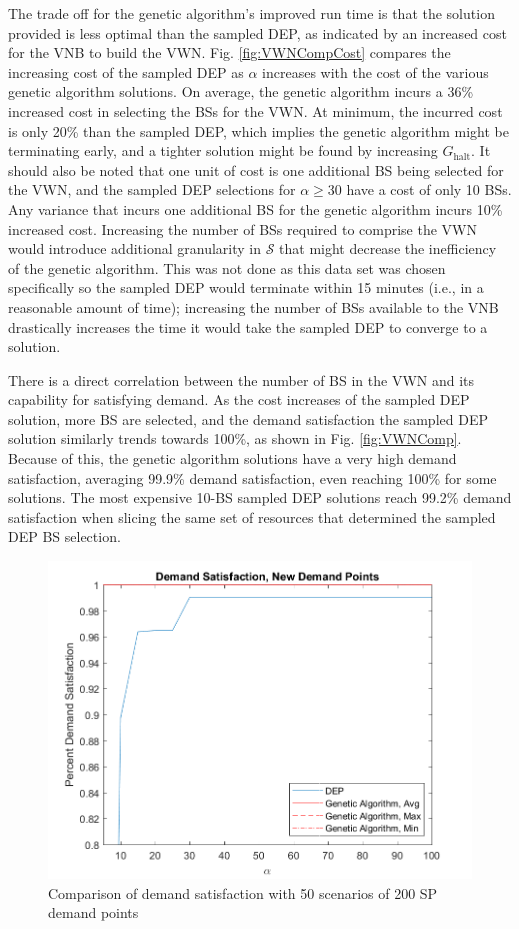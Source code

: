 \documentclass[onecolumn,draftcls]{IEEEtran}
\begin{document}
The trade off for the genetic algorithm's improved run time is that the solution provided is less optimal than the sampled DEP, as indicated by an increased cost for the VNB to build the VWN.  Fig. \ref{fig:VWNCompCost} compares the increasing cost of the sampled DEP as $\alpha$ increases with the cost of the various genetic algorithm solutions.  On average, the genetic algorithm incurs a 36\% increased cost in selecting the BSs for the VWN.  At minimum, the incurred cost is only 20\% than the sampled DEP, which implies the genetic algorithm might be terminating early, and a tighter solution might be found by increasing $G_\text{halt}$.  It should also be noted that one unit of cost is one additional BS being selected for the VWN, and the sampled DEP selections for $\alpha \geq 30$ have a cost of only 10 BSs.  Any variance that incurs one additional BS for the genetic algorithm incurs 10\% increased cost.  Increasing the number of BSs required to comprise the VWN would introduce additional granularity in $\mathcal{S}$ that might decrease the inefficiency of the genetic algorithm.  This was not done as this data set was chosen specifically so the sampled DEP would terminate within 15 minutes (i.e., in a reasonable amount of time); increasing the number of BSs available to the VNB drastically increases the time it would take the sampled DEP to converge to a solution.

There is a direct correlation between the number of BS in the VWN and its capability for satisfying demand.  As the cost increases of the sampled DEP solution, more BS are selected, and the demand satisfaction the sampled DEP solution similarly trends towards 100\%, as shown in Fig. \ref{fig:VWNComp}.  Because of this, the genetic algorithm solutions have a very high demand satisfaction, averaging 99.9\% demand satisfaction, even reaching 100\% for some solutions.  The most expensive 10-BS sampled DEP solutions reach 99.2\% demand satisfaction when slicing the same set of resources that determined the sampled DEP BS selection.

\begin{figure}
	\centering
	\includegraphics[width=0.8\linewidth]{Figures/ComparisonSatisfactionEval}
	\caption{Comparison of demand satisfaction with 50 scenarios of 200 SP demand points}
	\label{fig:VWNEvalCompSatis}
\end{figure}
\end{document}
